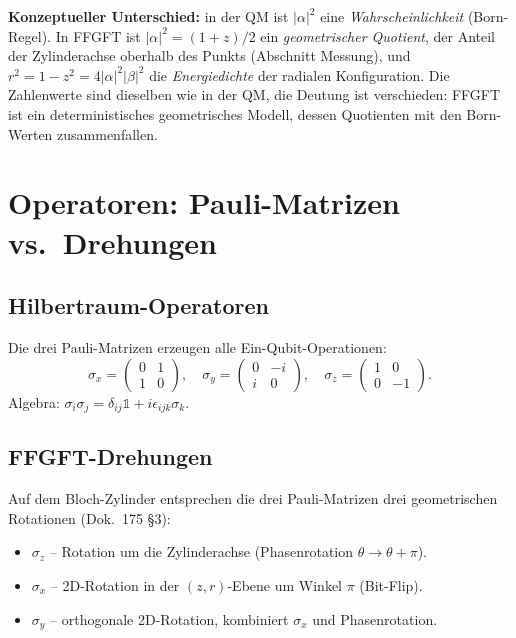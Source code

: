 \textbf{Konzeptueller Unterschied:} in der QM ist $|\alpha|^2$ eine
\emph{Wahrscheinlichkeit} (Born-Regel). In FFGFT ist
$|\alpha|^2 = (1+z)/2$ ein \emph{geometrischer Quotient}, der Anteil
der Zylinderachse oberhalb des Punkts (Abschnitt Messung), und
$r^2 = 1 - z^2 = 4|\alpha|^2|\beta|^2$ die \emph{Energiedichte} der
radialen Konfiguration. Die Zahlenwerte sind dieselben wie in der
QM, die Deutung ist verschieden: FFGFT ist ein deterministisches
geometrisches Modell, dessen Quotienten mit den Born-Werten
zusammenfallen.

\section{Operatoren: Pauli-Matrizen vs.\ Drehungen}

\subsection{Hilbertraum-Operatoren}

Die drei Pauli-Matrizen erzeugen alle Ein-Qubit-Operationen:
\begin{equation}
  \sigma_x = \begin{pmatrix}0 & 1 \\ 1 & 0\end{pmatrix},
  \quad
  \sigma_y = \begin{pmatrix}0 & -i \\ i & 0\end{pmatrix},
  \quad
  \sigma_z = \begin{pmatrix}1 & 0 \\ 0 & -1\end{pmatrix}.
\end{equation}
Algebra: $\sigma_i \sigma_j = \delta_{ij} \mathbb{1} + i\epsilon_{ijk}\sigma_k$.

\subsection{FFGFT-Drehungen}

Auf dem Bloch-Zylinder entsprechen die drei Pauli-Matrizen drei
geometrischen Rotationen (Dok.~175 §3):
\begin{itemize}[leftmargin=2em,itemsep=2pt,topsep=2pt]
  \item $\sigma_z$ -- Rotation um die Zylinderachse (Phasenrotation $\theta \to \theta + \pi$).
  \item $\sigma_x$ -- 2D-Rotation in der $(z, r)$-Ebene um Winkel $\pi$ (Bit-Flip).
  \item $\sigma_y$ -- orthogonale 2D-Rotation, kombiniert $\sigma_x$ und Phasenrotation.
\end{itemize}

